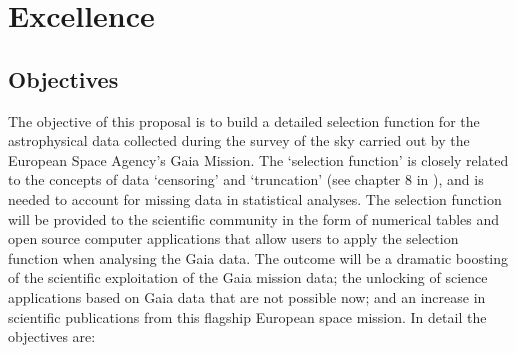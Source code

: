 \renewcommand{\thetable}{\thesection\alph{table}}

\chapter[Excellence]{Excellence}
\label{cha:excellence}

\section{Objectives}
\label{sec:objectives}

The objective of this proposal is to build a detailed selection function for the astrophysical data collected during the survey of the sky carried out by the European Space Agency's Gaia Mission. The `selection function' is closely related to the concepts of data `censoring' and `truncation' (see chapter 8 in \cite{Gelman}), and is needed to account for missing data in statistical analyses. The selection function will be provided to the scientific community in the form of numerical tables and open source computer applications that allow users to apply the selection function when analysing the Gaia data. The outcome will be a dramatic boosting of the scientific exploitation of the Gaia mission data; the unlocking of science applications based on Gaia data that are not possible now; and an increase in scientific publications from this flagship European space mission. In detail the objectives are:

